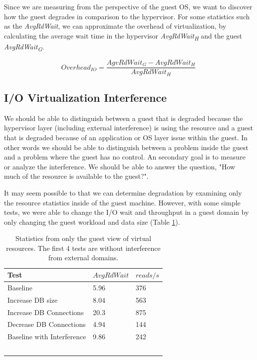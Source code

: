 Since we are measuring from the perspective of the guest OS, we want to discover how the guest degrades in comparison to the hypervisor.  
For some statistics such as the \emph{AvgRdWait}, we can approximate the overhead of virtualization, by calculating the average wait time in the hypervisor \emph{AvgRdWait\textsubscript{H}} and the guest \emph{AvgRdWait\textsubscript{G}}.

\begin{equation}
  Overhead_{IO} = \frac{AgvRdWait_G - AvgRdWait_H}{AvgRdWait_H} 
\end{equation}

\subsection{I/O Virtualization Interference}
We should be able to distinguish between a guest that is degraded because the hypervisor layer (including external interference) is using the resource and a guest that is degraded because of an application or OS layer issue within the guest.  In other words we should be able to distinguish between a problem inside the guest and a problem where the guest has no control.  An secondary goal is to measure or analyze the interference.  We should be able to answer the question, "How much of the resource is available to the guest?".

It may seem possible to that we can determine degradation by examining only the resource statistics inside of the guest machine.  However, with some simple tests, we were able to change the I/O wait and throughput in a guest domain by only changing the guest workload and data size (Table \ref{tab:guestOnly}).
 
\begin{table}[h]
  \begin{tabular}{ l l p{5cm} }
    Test & $AvgRdWait$ & $reads/s$  \\
    \hline
    Baseline                     & 5.96 & 376 \\   %
    Increase DB size             & 8.04 & 563 \\   %
    Increase DB Connections      & 20.3 & 875 \\   %
    Decrease DB Connections      & 4.94 & 144 \\   %
    Baseline with Interference   & 9.86 & 242 \\   %
    \hline
  \end{tabular}
\caption{Statistics from only the guest view of virtual resources.  The first 4 tests are without interference from external domains. }
\label{tab:guestOnly}
\end{table}

